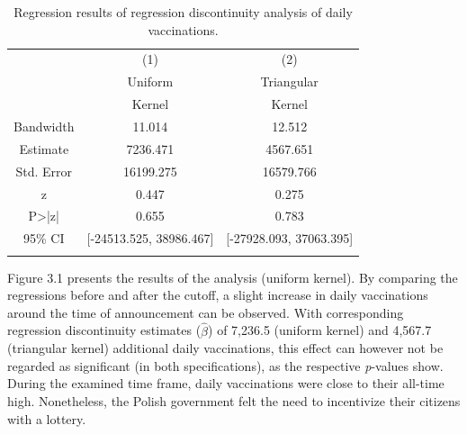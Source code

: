 \documentclass{scrbook}
\begin{document}
\vspace{-1.2cm}
\begin{table}[! htbp]\centering \caption[Results of regression discontinuity analysis of daily vaccinations in Poland]{Regression results of regression discontinuity analysis of daily vaccinations.}
\bigskip
\label{table:weightssynth}
\begin{threeparttable}
\begin{tabular}{c c c}
\toprule
 & (1) & (2)\\
 & Uniform & Triangular\\
 & Kernel & Kernel\\ \midrule
Bandwidth & 11.014 & 12.512\\
Estimate & 7236.471 & 4567.651\\
Std. Error & 16199.275 & 16579.766\\
z & 0.447 & 0.275\\
P>|z| & 0.655 & 0.783\\
95\% CI & [-24513.525, 38986.467] & [-27928.093, 37063.395]\\
\bottomrule\addlinespace[1ex]
\end{tabular}
\end{threeparttable}
\label{table2}
\end{table}

Figure 3.1 presents the results of the analysis (uniform kernel). By
comparing the regressions before and after the cutoff, a slight increase
in daily vaccinations around the time of announcement can be observed.
With corresponding regression discontinuity estimates (\(\hat{\beta}\))
of 7,236.5 (uniform kernel) and 4,567.7 (triangular kernel) additional
daily vaccinations, this effect can however not be regarded as
significant (in both specifications), as the respective
\textit{p}-values show. During the examined time frame, daily
vaccinations were close to their all-time high. Nonetheless, the Polish
government felt the need to incentivize their citizens with a lottery.
\end{document}
